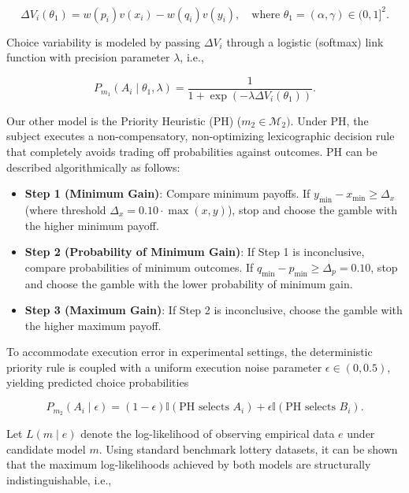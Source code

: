 \documentclass{article}
\theoremstyle{definition}
\begin{document}
\begin{equation}
\Delta V_i(\theta_1) = w(p_i) v(x_i) - w(q_i) v(y_i), \quad \text{where } \theta_1 = (\alpha, \gamma) \in (0,1]^2.
\end{equation}

\noindent
Choice variability is modeled by passing $\Delta V_i$ through a logistic (softmax) link function with precision parameter $\lambda$, i.e., 

\begin{equation}
P_{m_1}(A_i \mid \theta_1, \lambda) = \frac{1}{1 + \exp\left(-\lambda \Delta V_i(\theta_1)\right)}.
\end{equation}

\noindent
Our other model is the Priority Heuristic (PH) \cite{Kat24} ($m_2 \in \mathcal{M}_2)$. Under PH, the subject executes a non-compensatory, non-optimizing lexicographic decision rule that completely avoids trading off probabilities against outcomes. PH can be described algorithmically as follows:

\begin{itemize}
    \item \textbf{Step 1 (Minimum Gain)}: Compare minimum payoffs. If $y_{\min} - x_{\min} \ge \Delta_x$ (where threshold $\Delta_x = 0.10 \cdot \max(x, y)$), stop and choose the gamble with the higher minimum payoff.

    \item \textbf{Step 2 (Probability of Minimum Gain)}: If Step 1 is inconclusive, compare probabilities of minimum outcomes. If $q_{\min} - p_{\min} \ge \Delta_p = 0.10$, stop and choose the gamble with the lower probability of minimum gain.

    \item \textbf{Step 3 (Maximum Gain)}: If Step 2 is inconclusive, choose the gamble with the higher maximum payoff.
\end{itemize}

\noindent
To accommodate execution error in experimental settings, the deterministic priority rule is coupled with a uniform execution noise parameter $\epsilon \in (0, 0.5)$, yielding predicted choice probabilities

\begin{equation}
P_{m_2}(A_i \mid \epsilon) = (1 - \epsilon) \mathbb{I}(\text{PH selects } A_i) + \epsilon \mathbb{I}(\text{PH selects } B_i).
\end{equation}

\noindent
Let $L(m \mid e)$ denote the log-likelihood of observing empirical data $e$ under candidate model $m$. Using standard benchmark lottery datasets, it can be shown that the maximum log-likelihoods achieved by both models are structurally indistinguishable, i.e.,
\end{document}
